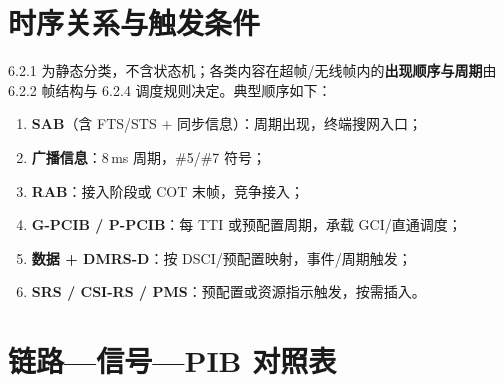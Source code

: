 \documentclass[11pt,a4paper]{ctexart}
\begin{document}
\section{时序关系与触发条件}

6.2.1 为静态分类，不含状态机；各类内容在超帧/无线帧内的\textbf{出现顺序与周期}由 6.2.2 帧结构与 6.2.4 调度规则决定。典型顺序如下：

\begin{enumerate}[nosep]
  \item \textbf{SAB}（含 FTS/STS + 同步信息）：周期出现，终端搜网入口；
  \item \textbf{广播信息}：8\,ms 周期，\#5/\#7 符号；
  \item \textbf{RAB}：接入阶段或 COT 末帧，竞争接入；
  \item \textbf{G-PCIB / P-PCIB}：每 TTI 或预配置周期，承载 GCI/直通调度；
  \item \textbf{数据 + DMRS-D}：按 DSCI/预配置映射，事件/周期触发；
  \item \textbf{SRS / CSI-RS / PMS}：预配置或资源指示触发，按需插入。
\end{enumerate}

\section{链路—信号—PIB 对照表}
\end{document}
